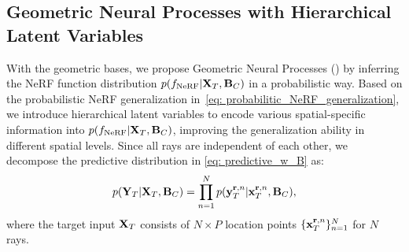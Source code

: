 %

\subsection{Geometric Neural Processes with Hierarchical Latent Variables}
\label{sec: hierar}

With the geometric bases, we propose Geometric Neural Processes (\textbf{\method{}}) by inferring the NeRF function distribution $p(f_{\text{NeRF}}|{\bf{X}}_{T}, {\bf{{B}}}_{C})$ in a probabilistic way.  
Based on the probabilistic NeRF generalization in~\cref{eq: probabilitic_NeRF_generalization}, we introduce hierarchical latent variables to encode various spatial-specific information into $p(f_{\text{NeRF}}|{\bf{X}}_{T}, {\bf{{B}}}_{C})$, improving the generalization ability in different spatial levels.
Since all rays are independent of each other, we decompose the predictive distribution in \cref{eq: predictive_w_B} as:
\begin{equation}
    p({\bf{Y}}_{T}| {\bf{X}}_{T},  {\bf{B}}_{C})  = \prod_{n=1}^{N} p({\bf{y}}_{T}^{\mathbf{r}, n}| {\bf{x}}_{T}^{{\mathbf{r}}, n},  {\bf{B}}_{C}),
\label{eq: predictive_distribution_ray_specific}
\end{equation}
where the target input ${\bf{X}}_{T}$ consists of $N \times P$ location points $\{{\bf{x}}_{T}^{{\mathbf{r}}, n}\}_{n=1}^{N}$ for $N$ rays.


